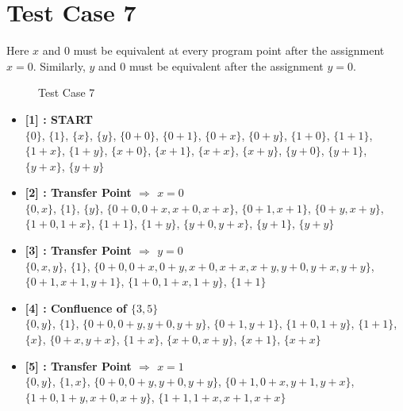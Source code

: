 \section{Test Case 7}
\label{sec:tc3}
Here $x$ and $0$ must be equivalent at every program point after the assignment
$x = 0$. Similarly, $y$ and $0$ must be equivalent after the assignment $y = 0$.

\begin{figure}[H]
\label{fig:tc7}
    \caption{Test Case 7}
\end{figure}

\begin{itemize}

    \item \textbf{[1] : START}\\
        $\{0\}$, $\{1\}$, $\{x\}$, $\{y\}$, $\{0 + 0\}$, $\{0 + 1\}$, $\{0 + x\}$, $\{0 + y\}$, $\{1 + 0\}$, $\{1 + 1\}$, $\{1 + x\}$, $\{1 + y\}$, $\{x + 0\}$, $\{x + 1\}$, $\{x + x\}$, $\{x + y\}$, $\{y + 0\}$, $\{y + 1\}$, $\{y + x\}$, $\{y + y\}$

    \item \textbf{[2] : Transfer Point $\Rightarrow$ $x = 0$}\\
        $\{0, x\}$, $\{1\}$, $\{y\}$, $\{0 + 0, 0 + x, x + 0, x + x\}$, $\{0 + 1, x + 1\}$, $\{0 + y, x + y\}$, $\{1 + 0, 1 + x\}$, $\{1 + 1\}$, $\{1 + y\}$, $\{y + 0, y + x\}$, $\{y + 1\}$, $\{y + y\}$

    \item \textbf{[3] : Transfer Point $\Rightarrow$ $y = 0$}\\
        $\{0, x, y\}$, $\{1\}$, $\{0 + 0, 0 + x, 0 + y, x + 0, x + x, x + y, y + 0, y + x, y + y\}$, $\{0 + 1, x + 1, y + 1\}$, $\{1 + 0, 1 + x, 1 + y\}$, $\{1 + 1\}$

    \item \textbf{[4] : Confluence of $\{3, 5\}$}\\
        $\{0, y\}$, $\{1\}$, $\{0 + 0, 0 + y, y + 0, y + y\}$, $\{0 + 1, y + 1\}$, $\{1 + 0, 1 + y\}$, $\{1 + 1\}$, $\{x\}$, $\{0 + x, y + x\}$, $\{1 + x\}$, $\{x + 0, x + y\}$, $\{x + 1\}$, $\{x + x\}$

    \item \textbf{[5] : Transfer Point $\Rightarrow$ $x = 1$}\\
        $\{0, y\}$, $\{1, x\}$, $\{0 + 0, 0 + y, y + 0, y + y\}$, $\{0 + 1, 0 + x, y + 1, y + x\}$, $\{1 + 0, 1 + y, x + 0, x + y\}$, $\{1 + 1, 1 + x, x + 1, x + x\}$

\end{itemize}

